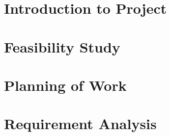 \documentclass[12pt]{report}
\begin{document}




\footskip 0.7cm
\thispagestyle{empty} 
\pagetitle
\newpage
{}
\cfoot{\thepage}



\newpage
\tableofcontents
\newpage
\listoffigures
\newpage

\cfoot{\thepage}

\newpage

\chapter{Introduction to Project}

\chapter{Feasibility Study}

\chapter{Planning of Work}

\chapter{Requirement Analysis}


\end{document}
